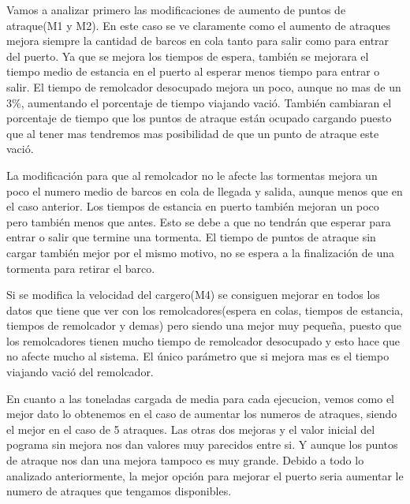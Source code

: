 \documentclass[]{article}
\begin{document}
Vamos a analizar primero las modificaciones de aumento de puntos de atraque(M1 y M2). En este caso se ve claramente como el aumento de atraques mejora siempre la cantidad de barcos en cola tanto para salir como para entrar del puerto. Ya que se mejora los tiempos de espera, también se mejorara el tiempo medio de estancia en el puerto al esperar menos tiempo para entrar o salir. El tiempo de remolcador desocupado mejora un poco, aunque no mas de un 3\%, aumentando el porcentaje de tiempo viajando vació. También cambiaran el porcentaje de tiempo que los puntos de atraque están ocupado cargando puesto que al tener mas tendremos mas posibilidad de que un punto de atraque este vació.

La modificación para que al remolcador no le afecte las tormentas mejora un poco el numero medio de barcos en cola de llegada y salida, aunque menos que en el caso anterior. Los tiempos de estancia en puerto también mejoran un poco pero también menos que antes. Esto se debe a que no tendrán que esperar para entrar o salir que termine una tormenta. El tiempo de puntos de atraque sin cargar también mejor por el mismo motivo, no se espera a la finalización de una tormenta para retirar el barco.

Si se modifica la velocidad del cargero(M4) se consiguen mejorar en todos los datos que tiene que ver con los remolcadores(espera en colas, tiempos de estancia, tiempos de remolcador y demas) pero siendo una mejor muy pequeña, puesto que los remolcadores tienen mucho tiempo de remolcador desocupado y esto hace que no afecte mucho al sistema. El único parámetro que si mejora mas es el tiempo viajando vació del remolcador. 

En cuanto a las toneladas cargada de media para cada ejecucion, vemos como el mejor dato lo obtenemos en el caso de aumentar los numeros de atraques, siendo el mejor en el caso de 5 atraques. Las otras dos mejoras y el valor inicial del pograma sin mejora nos dan valores muy parecidos entre si. Y aunque los puntos de atraque nos dan una mejora tampoco es muy grande. 
Debido a todo lo analizado anteriormente, la mejor opción para mejorar el puerto seria aumentar le numero de atraques que tengamos disponibles.
\end{document}
